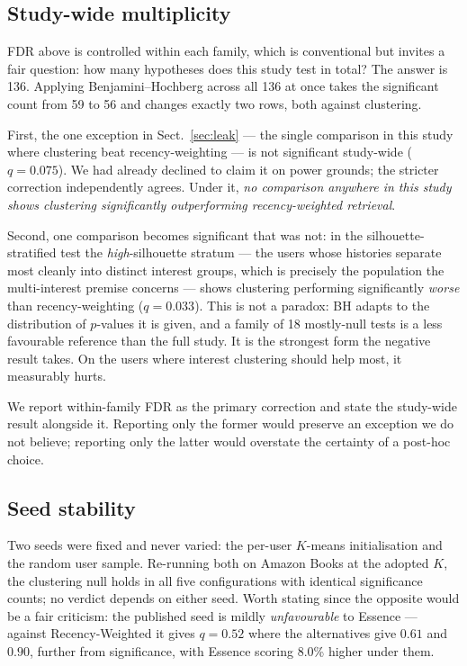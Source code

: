 \documentclass[runningheads]{llncs}
\begin{document}
\subsection{Study-wide multiplicity}\label{sec:multi}

FDR above is controlled within each family, which is conventional but invites a fair
question: how many hypotheses does this study test in total? The answer is 136. Applying
Benjamini--Hochberg across all 136 at once takes the significant count from 59 to 56 and
changes exactly two rows, both against clustering.

First, the one exception in Sect.~\ref{sec:leak} --- the single comparison in this study where
clustering beat recency-weighting --- is not significant study-wide ($q = 0.075$). We had
already declined to claim it on power grounds; the stricter correction independently agrees.
Under it, \emph{no comparison anywhere in this study shows clustering significantly
outperforming recency-weighted retrieval}.

Second, one comparison becomes significant that was not: in the silhouette-stratified test the
\emph{high}-silhouette stratum --- the users whose histories separate most cleanly into
distinct interest groups, which is precisely the population the multi-interest premise
concerns --- shows clustering performing significantly \emph{worse} than recency-weighting
($q = 0.033$). This is not a paradox: BH adapts to the distribution of $p$-values it is given, and a
family of 18 mostly-null tests is a less favourable reference than the full study. It is the strongest form the negative result takes. On the
users where interest clustering should help most, it measurably hurts.

We report within-family FDR as the primary correction and state the study-wide result
alongside it. Reporting only the former would preserve an exception we do not believe;
reporting only the latter would overstate the certainty of a post-hoc choice.

\subsection{Seed stability}\label{sec:seeds}

Two seeds were fixed and never varied: the per-user $K$-means initialisation and the random
user sample. Re-running both on Amazon Books at the adopted $K$, the clustering null holds in
all five configurations with identical significance counts; no verdict depends on either
seed. Worth stating since the opposite would be a fair criticism: the published seed is
mildly \emph{unfavourable} to Essence --- against Recency-Weighted it gives $q = 0.52$
where the alternatives give $0.61$ and $0.90$, further from significance, with Essence
scoring 8.0\% higher under them.
\end{document}
